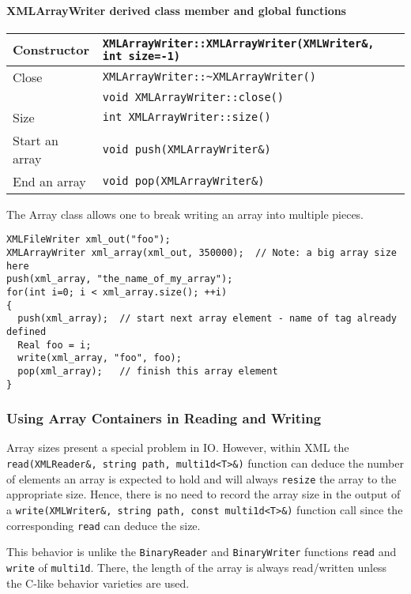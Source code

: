 \documentclass[12pt,letterpaper]{article}
\begin{document}
\paragraph{XMLArrayWriter derived class member and global functions}

\begin{flushleft}
  \begin{tabular}{|l|l|}
  \hline
  Constructor    & \verb|XMLArrayWriter::XMLArrayWriter(XMLWriter&, int size=-1)|\\
  \hline
  Close          & \verb|XMLArrayWriter::~XMLArrayWriter()|\\
                 & \verb|void XMLArrayWriter::close()|\\
  \hline
  Size           & \verb|int XMLArrayWriter::size()| \\
  \hline
  Start an array  & \verb|void push(XMLArrayWriter&)|\\
  End an array    & \verb|void pop(XMLArrayWriter&)|\\
  \hline
 \end{tabular}
\end{flushleft}
%
The Array class allows one to break writing an array into multiple pieces.
%
\begin{verbatim}
XMLFileWriter xml_out("foo");
XMLArrayWriter xml_array(xml_out, 350000);  // Note: a big array size here
push(xml_array, "the_name_of_my_array");
for(int i=0; i < xml_array.size(); ++i)
{
  push(xml_array);  // start next array element - name of tag already defined
  Real foo = i;
  write(xml_array, "foo", foo);
  pop(xml_array);   // finish this array element
}
\end{verbatim}

\subsubsection{Using Array Containers in Reading and Writing}

Array sizes present a special problem in IO. However, within XML
the \verb|read(XMLReader&, string path, multi1d<T>&)| function can
deduce the number of elements an array is expected to hold and will
always \verb|resize| the array to the appropriate size. 
Hence, there is no need to record the array size in the output
of a \verb|write(XMLWriter&, string path, const multi1d<T>&)| function
call since the corresponding \verb|read| can deduce the size.

This behavior is unlike the \verb|BinaryReader| and
\verb|BinaryWriter| functions \verb|read| and \verb|write| of
\verb|multi1d|. There, the length of the array is always read/written
unless the C-like behavior varieties are used.
\end{document}
